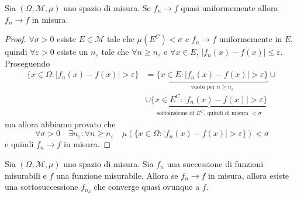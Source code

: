 \begin{theorem}\label{thm:2}
    Sia \((\Omega, \mathcal{M}, \mu)\) uno spazio di misura. Se \(f_{n} \to f\)
    quasi uniformemente allora \(f_{n} \to f\) in misura.
\end{theorem}
\begin{proof}
    \(\forall \sigma > 0\) esiste \(E \in \mathcal{M}\) tale che \(\mu{(E^{C})}
    < \sigma\) e \(f_{n} \to f\) uniformemente in \(E\), quindi 
    \(\forall  \varepsilon>0\) esiste un \(n_\varepsilon\) tale che \(\forall n
    \ge n_\varepsilon\) e \(\forall x \in E\), \(|f_{n}{(x)} - f{(x)}| \le
    \varepsilon\). Proseguendo
    \begin{align*}
        \{x \in \Omega : \left| f_{n}{(x)} - f{(x)} \right| > \varepsilon\} &=
        \underbrace{\{x \in E : \left| f_{n}{(x)} - f{(x)} \right| > \varepsilon 
        \}}_{\text{vuoto per } n \ge n_\varepsilon}  \cup \\
     &\cup \underbrace{\{x \in E^{C} : \left| f_{n}{(x)} - f{(x)}\right| >\varepsilon
         \}}_{\text{sottoinsieme di \(E^{C}\), quindi di misura \(<
        \sigma\)}}  
    \end{align*}
    ma allora abbiamo provato che
    \[
        \forall \sigma > 0 \quad \exists n_\varepsilon : \forall n \ge
        n_\varepsilon \quad \mu{\left( \{x \in \Omega : \left| f_{n}{(x)} -
        f{(x)} \right| > \varepsilon \}  \right)} < \sigma
    \]
    e quindi \(f_{n} \to f\) in misura.
\end{proof}


\begin{theorem}\label{thm:3}
    Sia \((\Omega, \mathcal{M}, \mu)\) uno spazio di misura. Sia \(f_{n}\) una
    successione di funzioni misurabili e \(f\) una funzione misurabile. Allora
    se \(f_{n} \to f\) in misura, allora esiste una sottosuccessione \(f_{n_{k}}\)
    che converge quasi ovunque a \(f\).
\end{theorem}

